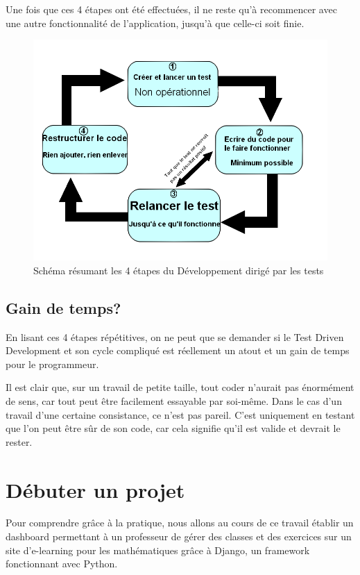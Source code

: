 \documentclass[letterpaper,10pt,french]{sphinxmanual}
\begin{document}
Une fois que ces 4 étapes ont été effectuées, il ne reste qu'à
recommencer avec une autre fonctionnalité de l'application, jusqu'à
que celle-ci soit finie.
\begin{figure}[htbp]
\centering
\capstart

\includegraphics[width=0.500\linewidth]{TDD.png}
\caption{Schéma résumant les 4 étapes du Développement dirigé par les tests}\end{figure}


\section{Gain de temps?}
\label{tdd:gain-de-temps}
En lisant ces 4 étapes répétitives, on ne peut que se demander si le Test
Driven Development et son cycle compliqué est réellement un atout et un gain
de temps pour le programmeur.

Il est clair que, sur un travail de petite taille, tout coder n'aurait pas
énormément de sens, car tout peut être facilement essayable par soi-même.
Dans le cas d'un travail d'une certaine consistance, ce n'est pas pareil.
C'est uniquement en testant que l'on peut être sûr de son code, car cela
signifie qu'il est valide et devrait le rester.


\chapter{Débuter un projet}
\label{projet1:debuter-un-projet}\label{projet1::doc}
Pour comprendre grâce à la pratique, nous allons au cours de ce travail établir
un dashboard permettant à un professeur de gérer des classes et des exercices
sur un site d'e-learning pour les mathématiques grâce à Django, un framework
fonctionnant avec Python.
\end{document}
